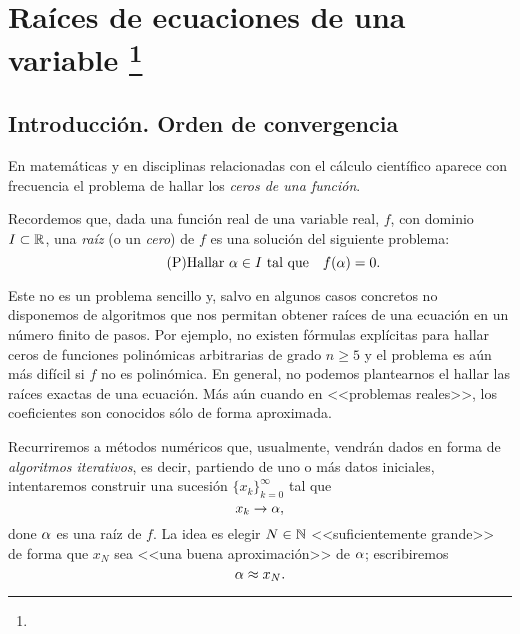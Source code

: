 
\chapter[Ecuaciones de una variable]{Raíces de ecuaciones de una variable%
  \footnote{\licenseInfo}}
\label{cha:ecuaciones-una-variable}

\section{Introducción. Orden de convergencia}
\label{sec:intro-orden-convergencia}

En matemáticas y en disciplinas relacionadas con el cálculo científico
aparece con frecuencia el problema de hallar los \textit{ceros de una
  función}.
\begin{center}
\end{center}

Recordemos que, dada una función real de una variable real, $f$, con
dominio $I\subset\operatorname{{\mathbb R}}$, una \textit{raíz} (o un \textit{cero}) de $f$
es una solución del siguiente problema:
\begin{equation}
\label{eq:raiz}
\tag{P}
\text{Hallar $\alpha\in I$ tal que} \quad f(\alpha)=0.
\end{equation}


Este no es un problema sencillo y, salvo en algunos casos concretos no
disponemos de algoritmos que nos permitan obtener raíces de una
ecuación en un número finito de pasos. Por ejemplo, no existen
fórmulas explícitas para hallar ceros de funciones polinómicas
arbitrarias de grado $n\ge 5$ y el problema es aún más difícil si $f$
no es polinómica. En general, no podemos plantearnos el hallar las
raíces exactas de una ecuación. Más aún cuando en <<problemas
reales>>, los coeficientes son conocidos sólo de forma aproximada.

Recurriremos a métodos numéricos que, usualmente, vendrán dados en
forma de \textit{algoritmos iterativos}, es decir, partiendo de uno o
más datos iniciales, intentaremos construir una sucesión
$\{x_k\}_{k=0}^{\infty}$ tal que
$$
x_k \to \alpha,
$$
done $\alpha$ es una raíz de $f$. La idea es elegir $N\in\operatorname{{\mathbb N}}$
<<suficientemente grande>> de forma que $x_N$ sea <<una buena
aproximación>> de $\alpha$; escribiremos
$$
\alpha\approx x_N.
$$

